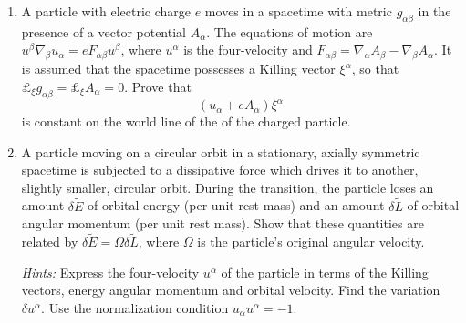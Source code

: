 \documentclass{article}
\begin{document}
\begin{enumerate}
  \item A particle with electric charge $e$ moves in a spacetime with metric $g_{\alpha\beta}$ in the presence of a vector potential $A_\alpha$. The equations of motion are $u^\beta \nabla_\beta u_\alpha = e F_{\alpha\beta}u^\beta$, where $u^\alpha$ is the four-velocity and $F_{\alpha\beta}=\nabla_\alpha A_\beta - \nabla_\beta A_\alpha$. It is assumed that the spacetime possesses a Killing vector $\xi^\alpha$, so that $\pounds_\xi g_{\alpha\beta} = \pounds_\xi A_\alpha = 0$. Prove that
    \begin{equation}
      \label{eq:conserved-quantity-em-field}
      (u_\alpha + e A_\alpha)\xi^\alpha
    \end{equation}
    is constant on the world line of the of the charged particle.

  \item A particle moving on a circular orbit in a stationary, axially symmetric spacetime is subjected to a dissipative force which drives it to another, slightly smaller, circular orbit. During the transition, the particle loses an amount $\delta \tilde{E}$ of orbital energy (per unit rest mass) and an amount $\delta \tilde{L}$ of orbital angular momentum (per unit rest mass). Show that these quantities are related by $\delta\tilde{E} = \Omega \delta\tilde{L}$, where $\Omega$ is the particle's original angular velocity.

    {\itshape Hints:} Express the four-velocity $u^\alpha$ of the particle in terms of the Killing vectors, energy angular momentum and orbital velocity. Find the variation $\delta u^\alpha$. Use the normalization condition $u_\alpha u^\alpha = -1$.
\end{enumerate}
\end{document}
